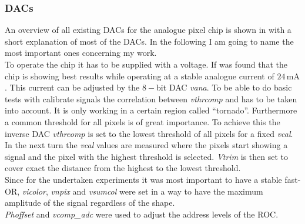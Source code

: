 \documentclass[british,11pt,a4paper]{memoir}
\begin{document}
\subsubsection{\ac{DAC}s}\label{sdacs}
An overview of all existing \ac{DAC}s for the analogue pixel chip is shown in  with a short explanation of most of the \ac{DAC}s. In the following I am going to name the most important ones concerning my work.\\
To operate the chip it has to be supplied with a voltage. If was found that the chip is showing best results while operating at a stable analogue current of $24\,$mA \cite{dambach}. This current can be adjusted by the $8-$bit \ac{DAC} \textit{vana}. To be able to do basic tests with calibrate signals the correlation between \textit{vthrcomp} and \textit{} has to be taken into account. It is only working in a certain region called ``tornado''. Furthermore a common threshold for all pixels is of great importance. To achieve this the inverse \ac{DAC} \textit{vthrcomp} is set to the lowest threshold of all pixels for a fixed \textit{vcal}. In the next turn the \textit{vcal} values are measured where the pixels start showing a signal and the pixel with the highest threshold is selected. \textit{Vtrim} is then set to cover exact the distance from the highest to the lowest threshold.\\
Since for the undertaken experiments it was most important to have a stable fast-OR, \textit{vicolor}, \textit{vnpix} and \textit{vsumcol} were set in a way to have the maximum amplitude of the signal regardless of the shape.\\
\textit{Phoffset} and \textit{vcomp\_adc} were used to adjust the address levels of the \ac{ROC}.
\end{document}
